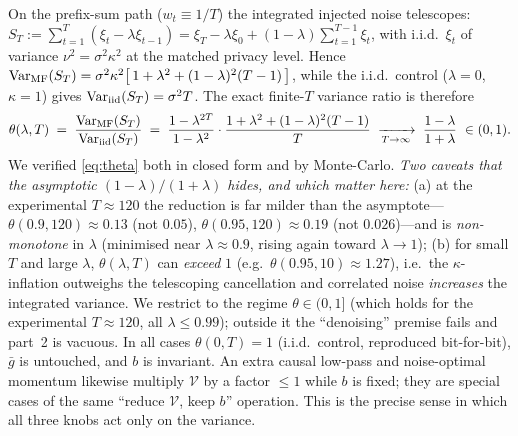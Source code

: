 On the prefix-sum path ($w_t\equiv1/T$) the integrated injected noise telescopes:
$S_T:=\sum_{t=1}^{T}(\xi_t-\lambda\xi_{t-1})=\xi_T-\lambda\xi_0+(1-\lambda)\sum_{t=1}^{T-1}\xi_t$,
with i.i.d.\ $\xi_t$ of variance $\nu^2=\sigma^2\kappa^2$ at the matched privacy level. Hence
$\operatorname{Var}_{\mathrm{MF}}(S_T)=\sigma^2\kappa^2\big[\,1+\lambda^2+(1-\lambda)^2(T-1)\,\big]$, while the
i.i.d.\ control ($\lambda{=}0$, $\kappa{=}1$) gives $\operatorname{Var}_{\mathrm{iid}}(S_T)=\sigma^2 T$.
The exact finite-$T$ variance ratio is therefore
\begin{equation}
\label{eq:theta}
\theta(\lambda,T)\;=\;\frac{\Var_{\mathrm{MF}}(S_T)}{\Var_{\mathrm{iid}}(S_T)}\;=\;\frac{1-\lambda^{2T}}{1-\lambda^{2}}\cdot\frac{1+\lambda^2+(1-\lambda)^2(T-1)}{T}\;\xrightarrow[T\to\infty]{}\;\frac{1-\lambda}{1+\lambda}\ \in(0,1).
\end{equation}
We verified \eqref{eq:theta} both in closed form and by Monte-Carlo. \emph{Two caveats that the
asymptotic $(1-\lambda)/(1+\lambda)$ hides, and which matter here:} (a) at the experimental
$T\!\approx\!120$ the reduction is far milder than the asymptote---$\theta(0.9,120)\approx0.13$ (not
$0.05$), $\theta(0.95,120)\approx0.19$ (not $0.026$)---and is \emph{non-monotone} in $\lambda$
(minimised near $\lambda\!\approx\!0.9$, rising again toward $\lambda\!\to\!1$); (b) for small $T$
and large $\lambda$, $\theta(\lambda,T)$ can \emph{exceed} $1$ (e.g.\ $\theta(0.95,10)\approx1.27$),
i.e.\ the $\kappa$-inflation outweighs the telescoping cancellation and correlated noise
\emph{increases} the integrated variance. We restrict to the regime $\theta\in(0,1]$ (which holds
for the experimental $T\!\approx\!120$, all $\lambda\le0.99$); outside it the ``denoising'' premise
fails and part~2 is vacuous. In all cases $\theta(0,T)=1$ (i.i.d.\ control, reproduced
bit-for-bit), $\bar g$ is untouched, and $b$ is invariant. An extra causal low-pass and
noise-optimal momentum likewise multiply $\mathcal V$ by a factor $\le1$ while $b$ is fixed; they
are special cases of the same ``reduce $\mathcal V$, keep $b$'' operation. This is the precise sense
in which all three knobs act only on the variance.

